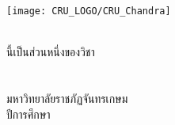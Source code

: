 \makeatletter
\clearpage\pagestyle{empty}
	{\centering
	\fontsize{16}{18.4}\selectfont
		\texttt{[image: CRU\_LOGO/CRU\_Chandra]}\\\vspace{\baselineskip}
		\bfseries\@thesistitleThai\\
		\bfseries\@thesistitle
	\vfill
	\fontsize{14}{16.1}\selectfont 
	
	\@authorThai
	\vfill

	\fontsize{13.1}{16.1}\selectfont
	\@typeofwritingThai นี้เป็นส่วนหนึ่งของวิชา\@researchsubjectThai\\
	\ifdefined\@degreeThai \@degreeThai\space\fi \ifdefined\@majorThai \@majorThai\space\fi \\
	\ifdefined\@facultyThai \@facultyThai\fi \\
	มหาวิทยาลัยราชภัฏจันทรเกษม\\
	ปีการศึกษา \the\year
	\par}


\cleardoublepage
\newpage


%
%
%
%

